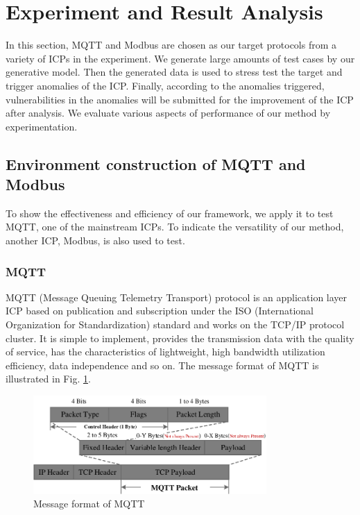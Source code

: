 \section{Experiment and Result Analysis}
In this section, MQTT and Modbus are chosen as our target protocols from a variety of ICPs in the experiment. We generate large amounts of test cases by our generative model. Then the generated data is used to stress test the target and trigger anomalies of the ICP. Finally,  according to the anomalies triggered, vulnerabilities in the anomalies will be submitted for the improvement of the ICP after analysis. We evaluate various aspects of performance of our method by experimentation. 

\subsection{Environment construction of MQTT and Modbus}
To show the effectiveness and efficiency of our framework, we apply it to test MQTT, one of the mainstream ICPs. To indicate the versatility of our method, another ICP, Modbus, is also used to test.

\subsubsection{MQTT}
MQTT (Message Queuing Telemetry Transport) protocol is an application layer ICP based on publication and subscription under the ISO (International Organization for Standardization) standard and works on the TCP/IP protocol cluster. It is simple to implement, provides the transmission data with the quality of service, has the characteristics of lightweight, high bandwidth utilization efficiency, data independence and so on. The message format of MQTT is illustrated in Fig. \ref{FigMQTTFormat}.  

\begin{figure}[htbp]   %
	\centering 
	\includegraphics[width=3.5in]{FigMQTTFormat.pdf}
	\caption{Message format of MQTT}
	\label{FigMQTTFormat}
\end{figure}

